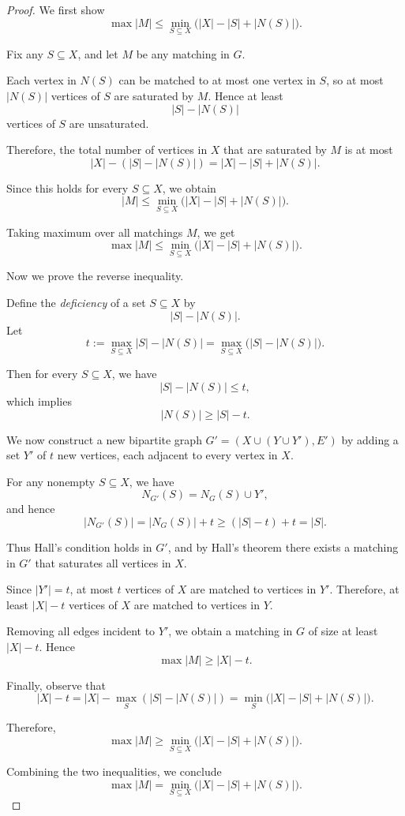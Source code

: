 \begin{proof}
We first show
\[
    \max |M| \le \min_{S \subseteq X} \big( |X| - |S| + |N(S)| \big).
\]

Fix any $S \subseteq X$, and let $M$ be any matching in $G$.

Each vertex in $N(S)$ can be matched to at most one vertex in $S$, so at most $|N(S)|$ vertices of $S$ are saturated by $M$. Hence at least
\[
    |S| - |N(S)|
\]
vertices of $S$ are unsaturated.

Therefore, the total number of vertices in $X$ that are saturated by $M$ is at most
\[
    |X| - (|S| - |N(S)|) = |X| - |S| + |N(S)|.
\]

Since this holds for every $S \subseteq X$, we obtain
\[
    |M| \le \min_{S \subseteq X} \big( |X| - |S| + |N(S)| \big).
\]

Taking maximum over all matchings $M$, we get
\[
    \max |M| \le \min_{S \subseteq X} \big( |X| - |S| + |N(S)| \big).
\]

\medskip

Now we prove the reverse inequality.

Define the \emph{deficiency} of a set $S \subseteq X$ by
\[
    |S| - |N(S)|.
\]
Let
\[
    t := \max_{S \subseteq X} |S| - |N(S)| = \max_{S \subseteq X} \big( |S| - |N(S)| \big).
\]

Then for every $S \subseteq X$, we have
\[
    |S| - |N(S)| \le t,
\]
which implies
\[
    |N(S)| \ge |S| - t.
\]

We now construct a new bipartite graph $G' = (X \cup (Y \cup Y'), E')$ by adding a set $Y'$ of $t$ new vertices, each adjacent to every vertex in $X$.

For any nonempty $S \subseteq X$, we have
\[
    N_{G'}(S) = N_G(S) \cup Y',
\]
and hence
\[
    |N_{G'}(S)| = |N_G(S)| + t \ge (|S| - t) + t = |S|.
\]

Thus Hall's condition holds in $G'$, and by Hall's theorem there exists a matching in $G'$ that saturates all vertices in $X$.

Since $|Y'| = t$, at most $t$ vertices of $X$ are matched to vertices in $Y'$. Therefore, at least $|X| - t$ vertices of $X$ are matched to vertices in $Y$.

Removing all edges incident to $Y'$, we obtain a matching in $G$ of size at least $|X| - t$. Hence
\[
    \max |M| \ge |X| - t.
\]

Finally, observe that
\[
    |X| - t = |X| - \max_{S} (|S| - |N(S)|)
    = \min_{S} \big( |X| - |S| + |N(S)| \big).
\]

Therefore,
\[
    \max |M| \ge \min_{S \subseteq X} \big( |X| - |S| + |N(S)| \big).
\]

\medskip

Combining the two inequalities, we conclude
\[
    \max |M| = \min_{S \subseteq X} \big( |X| - |S| + |N(S)| \big).
\]
\end{proof}

